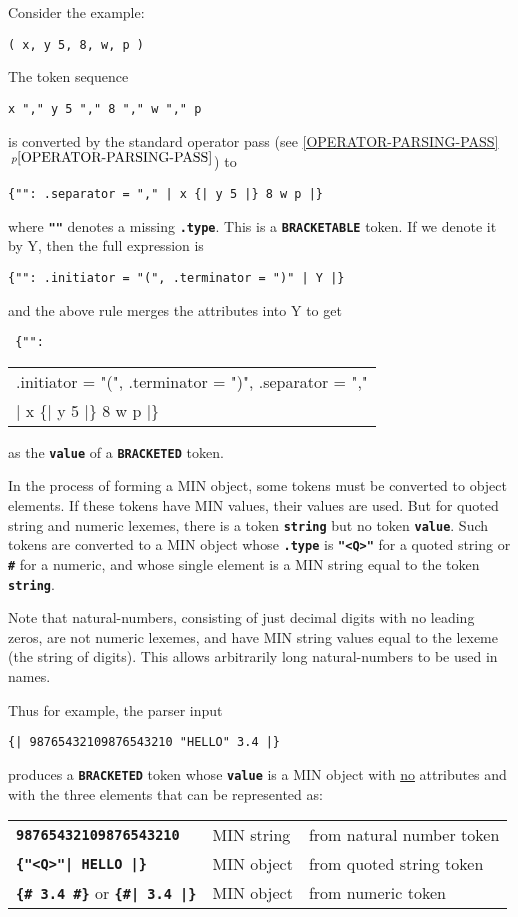 \documentclass[12pt]{article}
\newcommand{\TT}[1]{{\tt \bfseries #1}}
\newcommand{\itemref}[1]{\ref{#1}$\,^{p\pageref{#1}}$}
\begin{document}
Consider the example:
\begin{center}
\tt ( x, y 5, 8, w, p )
\end{center}

The token sequence
\begin{center}
\tt x "," y 5 "," 8 "," w "," p
\end{center}
is converted by the standard operator pass
(see \itemref{OPERATOR-PARSING-PASS})
to
\begin{center}
\tt \{"": .separator = "," | x  \{| y 5 |\} 8 w p |\}
\end{center}
where \TT{""} denotes a missing \TT{.type}.  This is a \TT{BRACKETABLE}
token.  If we denote it by Y,
then the full expression is
\begin{center}
\tt \{"": .initiator = "(", .terminator = ")" | Y |\}
\end{center}
and the above rule merges the attributes into Y to get
\begin{center}
\tt
\{"": \begin{tabular}[t]{l}
      .initiator = "(", .terminator = ")", .separator = "," \\
      | x  \{| y 5 |\} 8 w p |\}
      \end{tabular}
\end{center}
as the \TT{value} of a \TT{BRACKETED} token.

In the process of forming a MIN object, some tokens must be converted to
object elements.  If these tokens have MIN values, their values are used.
But for quoted string and numeric lexemes, there is a token \TT{string}
but no token \TT{value}.  Such tokens are converted to a MIN object
whose \TT{.type} is \TT{"<Q>"} for a quoted string or \TT{\#} for
a numeric, and whose single element is a MIN string equal to the
token \TT{string}.

Note that natural-numbers, consisting of just decimal digits
with no leading zeros, are not numeric lexemes, and have MIN string
values equal to the lexeme (the string of digits).  This allows
arbitrarily long natural-numbers to be used in names.

Thus for example, the parser input
\begin{center}
\tt \{| 98765432109876543210 "HELLO" 3.4 |\}
\end{center}
produces a \TT{BRACKETED} token whose \TT{value} is a MIN object with
\underline{no} attributes and with the three elements that
can be represented as:
\begin{center}
\begin{tabular}{lll}
\TT{98765432109876543210}	& MIN string	& from natural number token \\
\TT{\{"<Q>"| HELLO |\}}		& MIN object	& from quoted string token \\
\TT{\{\# 3.4 \#\}} or \TT{\{\#| 3.4 |\}}
				& MIN object	& from numeric token \\
\end{tabular}
\end{center}
\end{document}
